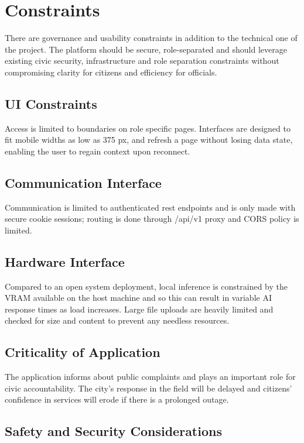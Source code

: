 \section{Constraints}

There are governance and usability constraints in addition to the technical one of the project. The platform should be secure, role-separated and should leverage existing civic security, infrastructure and role separation constraints without compromising clarity for citizens and efficiency for officials.

\subsection{UI Constraints}

Access is limited to boundaries on role specific pages. Interfaces are designed to fit mobile widths as low as 375 px, and refresh a page without losing data state, enabling the user to regain context upon reconnect.

\subsection{Communication Interface}

Communication is limited to authenticated rest endpoints and is only made with secure cookie sessions; routing is done through /api/v1 proxy and CORS policy is limited.

\subsection{Hardware Interface}

Compared to an open system deployment, local inference is constrained by the VRAM available on the host machine and so this can result in variable AI response times as load increases. Large file uploads are heavily limited and checked for size and content to prevent any needless resources.

\subsection{Criticality of Application}

The application informs about public complaints and plays an important role for civic accountability. The city's response in the field will be delayed and citizens' confidence in services will erode if there is a prolonged outage.

\subsection{Safety and Security Considerations}

